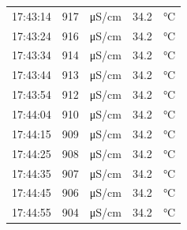 \documentclass[11pt]{article}
\begin{document}
\begin{enumerate}
\begin{center}
\begin{tabular}{rrlrl}
17:43:14 & 917 & μS/cm & 34.2 & °C\\
17:43:24 & 916 & μS/cm & 34.2 & °C\\
17:43:34 & 914 & μS/cm & 34.2 & °C\\
17:43:44 & 913 & μS/cm & 34.2 & °C\\
17:43:54 & 912 & μS/cm & 34.2 & °C\\
17:44:04 & 910 & μS/cm & 34.2 & °C\\
17:44:15 & 909 & μS/cm & 34.2 & °C\\
17:44:25 & 908 & μS/cm & 34.2 & °C\\
17:44:35 & 907 & μS/cm & 34.2 & °C\\
17:44:45 & 906 & μS/cm & 34.2 & °C\\
17:44:55 & 904 & μS/cm & 34.2 & °C\\
\end{tabular}
\end{center}


\end{enumerate}
\end{document}
